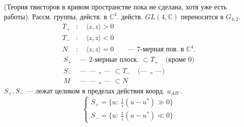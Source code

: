 (Теория твисторов в кривом пространстве пока не сделана, хотя уже есть работы).
Рассм. группы, действ. в \(\mathbb C^4\).
действ. \(GL(4,\mathbb C)\) переносится в \(G_{4,2}\).
\[
\begin{aligned}
T_+&:\quad\langle z,z\rangle>0\\
T_-&:\quad\langle z,z\rangle<0\\
N&:\quad\langle z,z\rangle=0\qquad\text{— 7-мерная пов. в }\mathbb C^4.
\end{aligned}
\]
\[
\begin{aligned}
S_+&\text{ — 2-мерные плоск. }\subset T_+\quad\text{(кроме 0)}\\
S_-&\text{ — — „ — }\subset T_-\quad\text{(— „ —)}\\
M&\text{ — — „ — }\subset N
\end{aligned}
\]
\(S_+,S_-\) — лежат целиком в пределах действия коорд. \(u_{AB'}\).
\[
\begin{cases}
S_+=\{u:\ \frac{1}{i}(u-u^*)\gg0\}\\
S_-=\{u:\ \frac{1}{i}(u-u^*)\ll0\}
\end{cases}\tag{17}
\]


